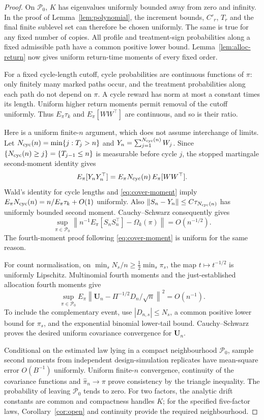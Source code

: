 \documentclass[12pt,a4paper]{article}
\theoremstyle{definition}
\theoremstyle{remark}\newtheorem{remark}{Remark}
\numberwithin{equation}{section}
\begin{document}
\begin{proof}
On $\mathcal P_0$, $K$ has eigenvalues uniformly bounded away from zero and infinity. In the proof of Lemma~\ref{lem:polynomial}, the increment bounds, $C'_r$, $T_r$ and the final finite sublevel set can therefore be chosen uniformly. The same is true for any fixed number of copies. All profile and treatment-sign probabilities along a fixed admissible path have a common positive lower bound. Lemma~\ref{lem:alloc-return} now gives uniform return-time moments of every fixed order.

For a fixed cycle-length cutoff, cycle probabilities are continuous functions of $\pi$: only finitely many marked paths occur, and the treatment probabilities along each path do not depend on $\pi$. A cycle reward has norm at most a constant times its length. Uniform higher return moments permit removal of the cutoff uniformly. Thus $E_\pi\tau_k$ and $E_\pi[WW^\top]$ are continuous, and so is their ratio.

Here is a uniform finite-$n$ argument, which does not assume interchange of limits. Let $N_{\rm cyc}(n)=\min\{j:T_j>n\}$ and $Y_n=\sum_{j=1}^{N_{\rm cyc}(n)}W_j$. Since $\{N_{\rm cyc}(n)\ge j\}=\{T_{j-1}\le n\}$ is measurable before cycle $j$, the stopped martingale second-moment identity gives
\[
 E_\pi[Y_nY_n^\top]=E_\pi N_{\rm cyc}(n)\,E_\pi[WW^\top].
\]
Wald's identity for cycle lengths and \eqref{eq:cover-moment} imply $E_\pi N_{\rm cyc}(n)=n/E_\pi\tau_k+O(1)$ uniformly. Also $\|S_n-Y_n\|\le C\tau_{N_{\rm cyc}(n)}$ has uniformly bounded second moment. Cauchy--Schwarz consequently gives
\[
 \sup_{\pi\in\mathcal P_0}
 \left\|n^{-1}E_\pi[S_nS_n^\top]-\Omega_k(\pi)\right\|=O(n^{-1/2}).
\]
The fourth-moment proof following \eqref{eq:cover-moment} is uniform for the same reason.

For count normalisation, on $\min_s N_s/n\ge\frac12\min_s\pi_s$, the map $t\mapsto t^{-1/2}$ is uniformly Lipschitz. Multinomial fourth moments and the just-established allocation fourth moments give
\[
 \sup_{\pi\in\mathcal P_0}E_\pi
 \left\|\bm U_n-\Pi^{-1/2}D_n/\sqrt n\right\|^2=O(n^{-1}).
\]
To include the complementary event, use $|D_{n,s}|\le N_s$, a common positive lower bound for $\pi_s$, and the exponential binomial lower-tail bound. Cauchy--Schwarz proves the desired uniform covariance convergence for $\bm U_n$.

Conditional on the estimated law lying in a compact neighbourhood $\mathcal P_0$, sample second moments from independent design-simulation replicates have mean-square error $O(B^{-1})$ uniformly. Uniform finite-$n$ convergence, continuity of the covariance functions and $\widehat\pi_n\to\pi$ prove consistency by the triangle inequality. The probability of leaving $\mathcal P_0$ tends to zero. For two factors, the analytic drift constants are common and compactness handles $K$; for the specified five-factor laws, Corollary~\ref{cor:open} and continuity provide the required neighbourhood.
\end{proof}
\end{document}
